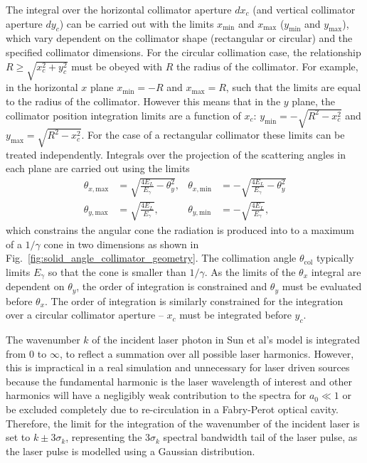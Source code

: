 \documentclass[../main.tex]{subfiles}
\begin{document}
The integral over the horizontal collimator aperture $dx_{c}$ (and vertical collimator aperture $dy_{c}$) can be carried out with the limits $x_{\mathrm{min}}$ and $x_{\mathrm{max}}$ ($y_{\mathrm{min}}$ and $y_{\mathrm{max}}$), which vary dependent on the collimator shape (rectangular or circular) and the specified collimator dimensions. For the circular collimation case, the relationship $R\geq\sqrt{x_{c}^{2}+y_{c}^{2}}$ must be obeyed with $R$ the radius of the collimator. For example, in the horizontal $x$ plane $x_{\mathrm{min}} = -R$ and $x_{\mathrm{max}} = R$, such that the limits are equal to the radius of the collimator. However this means that in the $y$ plane, the collimator position integration limits are a function of $x_{c}$: $y_{\mathrm{min}} = -\sqrt{R^{2}-x_{c}^{2}}$ and $y_{\mathrm{max}} = \sqrt{R^{2}-x_{c}^{2}}$. For the case of a rectangular collimator these limits can be treated independently.  
Integrals over the projection of the scattering angles in each plane are carried out using the limits
\begin{align}
\theta_{x,\mathrm{max}} &= \sqrt{\frac{4E_{L}}{E_{\gamma}}-\theta_{y}^{2}}, & \theta_{x,\mathrm{min}} &= -\sqrt{\frac{4E_{L}}{E_{\gamma}}-\theta_{y}^{2}} \nonumber\\ 
\theta_{y,\mathrm{max}} &= \sqrt{\frac{4E_{L}}{E_{\gamma}}}, & \theta_{y,\mathrm{min}} &= -\sqrt{\frac{4E_{L}}{E_{\gamma}}},  
\end{align}
which constrains the angular cone the radiation is produced into to a maximum of a $1/\gamma$ cone in two dimensions as shown in Fig.~\ref{fig:solid_angle_collimator_geometry}. The collimation angle $\theta_{\mathrm{col}}$ typically limits $E_{\gamma}$ so that the cone is smaller than $1/\gamma$. As the limits of the $\theta_{x}$ integral are dependent on $\theta_{y}$, the order of integration is constrained and $\theta_{y}$ must be evaluated before $\theta_{x}$. The order of integration is similarly constrained for the integration over a circular collimator aperture -- $x_{c}$ must be integrated before $y_{c}$.

The wavenumber $k$ of the incident laser photon in Sun et al's model \cite{sun2009characterizations,sun2011theoretical} is integrated from $0$ to $\infty$, to reflect a summation over all possible laser harmonics. However, this is impractical in a real simulation and unnecessary for laser driven sources because the fundamental harmonic is the laser wavelength of interest and other harmonics will have a negligibly weak contribution to the spectra for $a_{0} \ll 1$ or be excluded completely due to re-circulation in a Fabry-Perot optical cavity. Therefore, the limit for the integration of the wavenumber of the incident laser is set to $k\pm3\sigma_{k}$, representing the 3$\sigma_{k}$ spectral bandwidth tail of the laser pulse, as the laser pulse is modelled using a Gaussian distribution.  
\end{document}
